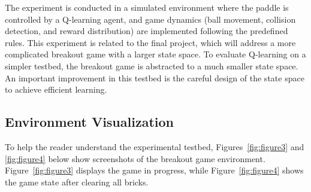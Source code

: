 \documentclass{article}
\begin{document}
The experiment is conducted in a simulated environment where the paddle is controlled by a Q-learning agent, and game dynamics (ball movement, collision detection, and reward distribution) are implemented following the predefined rules. This experiment is related to the final project, which will address a more complicated breakout game with a larger state space. To evaluate Q-learning on a simpler testbed, the breakout game is abstracted to a much smaller state space. An important improvement in this testbed is the careful design of the state space to achieve efficient learning.

\subsection{Environment Visualization}
To help the reader understand the experimental testbed, Figures~\ref{fig:figure3} and \ref{fig:figure4} below show screenshots of the breakout game environment. Figure~\ref{fig:figure3} displays the game in progress, while Figure~\ref{fig:figure4} shows the game state after clearing all bricks.
\end{document}

